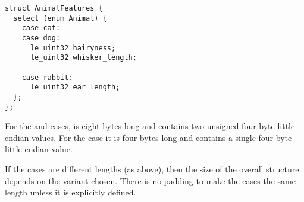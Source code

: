 \begin{verbatim}
struct AnimalFeatures {
  select (enum Animal) {
    case cat:
    case dog:
      le_uint32 hairyness;
      le_uint32 whisker_length;

    case rabbit:
      le_uint32 ear_length;
  };
};
\end{verbatim}

For the  and  cases,  is eight bytes long and contains two unsigned four-byte little-endian values.
%
For the  case it is four bytes long and contains a single four-byte little-endian value.

If the cases are different lengths (as above), then the size of the overall structure depends on the variant chosen.
%
There is no padding to make the cases the same length unless it is explicitly defined.
